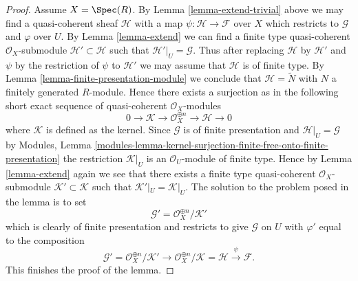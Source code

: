 \begin{proof}
\medskip\noindent
Assume $X = \Spec(R)$.
By Lemma \ref{lemma-extend-trivial} above we may
find a quasi-coherent sheaf $\mathcal{H}$ with
a map $\psi : \mathcal{H} \to \mathcal{F}$ over $X$
which restricts to $\mathcal{G}$ and $\varphi$ over $U$.
By Lemma \ref{lemma-extend} we can find a finite type
quasi-coherent $\mathcal{O}_X$-submodule
$\mathcal{H}' \subset \mathcal{H}$
such that $\mathcal{H}'|_U = \mathcal{G}$. Thus after
replacing $\mathcal{H}$ by $\mathcal{H}'$
and $\psi$ by the restriction of $\psi$ to $\mathcal{H}'$
we may assume that $\mathcal{H}$ is of finite type.
By Lemma \ref{lemma-finite-presentation-module}
we conclude that $\mathcal{H} = \widetilde{N}$ with
$N$ a finitely generated $R$-module. Hence there exists a surjection
as in the following short exact sequence of
quasi-coherent $\mathcal{O}_X$-modules
$$
0 \to \mathcal{K} \to \mathcal{O}_X^{\oplus n} \to \mathcal{H} \to 0
$$
where $\mathcal{K}$ is defined as the kernel.
Since $\mathcal{G}$ is of finite presentation and
$\mathcal{H}|_U = \mathcal{G}$ by
Modules, Lemma
\ref{modules-lemma-kernel-surjection-finite-free-onto-finite-presentation}
the restriction $\mathcal{K}|_U$ is
an $\mathcal{O}_U$-module of finite type. Hence by Lemma \ref{lemma-extend}
again we see that there exists a finite type quasi-coherent
$\mathcal{O}_X$-submodule $\mathcal{K}' \subset \mathcal{K}$ such
that $\mathcal{K}'|_U = \mathcal{K}|_U$. The solution to the problem
posed in the lemma is to set
$$
\mathcal{G}' = \mathcal{O}_X^{\oplus n}/\mathcal{K}'
$$
which is clearly of finite presentation and restricts to give $\mathcal{G}$
on $U$ with $\varphi'$ equal to the composition
$$
\mathcal{G}' = \mathcal{O}_X^{\oplus n}/\mathcal{K}'
\to \mathcal{O}_X^{\oplus n}/\mathcal{K} = \mathcal{H} \xrightarrow{\psi}
\mathcal{F}.
$$
This finishes the proof of the lemma.
\end{proof}
